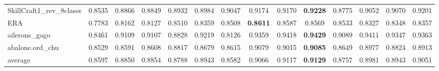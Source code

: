 \begin{tabular}{lccccccccccccc}
SkillCraft1_rev_8clases & 0.8535 & 0.8866 & 0.8849 & 0.8932 & 0.8984 & 0.9047 & 0.9174 & 0.9170 & \textbf{0.9228} & 0.8775 & 0.9052 & 0.9070 & 0.9201 \\
ERA & 0.7783 & 0.8162 & 0.8127 & 0.8510 & 0.8359 & 0.8508 & \textbf{0.8611} & 0.8587 & 0.8569 & 0.8533 & 0.8327 & 0.8348 & 0.8357 \\
ailerons_gago & 0.8461 & 0.9109 & 0.9107 & 0.8828 & 0.9219 & 0.8126 & 0.9359 & 0.9418 & \textbf{0.9429} & 0.9089 & 0.9411 & 0.9347 & 0.9363 \\
abalone.ord_chu & 0.8529 & 0.8591 & 0.8608 & 0.8817 & 0.8679 & 0.8615 & 0.9079 & 0.9015 & \textbf{0.9085} & 0.8649 & 0.8977 & 0.8824 & 0.8913 \\
average & 0.8597 & 0.8850 & 0.8854 & 0.8788 & 0.8943 & 0.8582 & 0.9066 & 0.9117 & \textbf{0.9129} & 0.8757 & 0.8981 & 0.8943 & 0.9051 \\
\bottomrule
\end{tabular}
